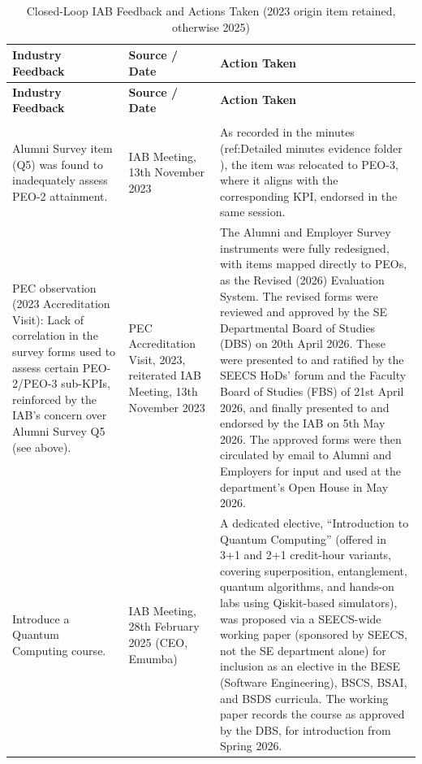 \begingroup
\footnotesize
\setlength{\tabcolsep}{4pt}
\renewcommand{\arraystretch}{1.2}
\begin{longtable}[]{@{}>{\raggedright\arraybackslash}p{}>{\raggedright\arraybackslash}p{}>{\raggedright\arraybackslash}p{}@{}}
\caption{Closed-Loop IAB Feedback and Actions Taken (2023 origin item retained, otherwise 2025)}\label{tab:iab_closed_loop}\\
\toprule
\textbf{Industry Feedback} & \textbf{Source / Date} & \textbf{Action Taken}\\
\midrule
\endfirsthead
\toprule
\textbf{Industry Feedback} & \textbf{Source / Date} & \textbf{Action Taken}\\
\midrule
\endhead
\midrule
\multicolumn{3}{r}{\footnotesize\itshape Continued on next page}\\
\endfoot
\bottomrule
\endlastfoot
Alumni Survey item (Q5) was found to inadequately assess PEO-2 attainment. & IAB Meeting, 13th November 2023 & As recorded in the minutes (ref:Detailed minutes evidence folder ), the item was relocated to PEO-3, where it aligns with the corresponding KPI, endorsed in the same session.\\
\addlinespace
PEC observation (2023 Accreditation Visit): Lack of correlation in the survey forms used to assess certain PEO-2/PEO-3 sub-KPIs, reinforced by the IAB's concern over Alumni Survey Q5 (see above). & PEC Accreditation Visit, 2023, reiterated IAB Meeting, 13th November 2023 & The Alumni and Employer Survey instruments were fully redesigned, with items mapped directly to PEOs, as the Revised (2026) Evaluation System. The revised forms were reviewed and approved by the SE Departmental Board of Studies (DBS) on 20th April 2026. These were presented to and ratified by the SEECS HoDs' forum and the Faculty Board of Studies (FBS) of 21st April 2026, and finally presented to and endorsed by the IAB on 5th May 2026. The approved forms were then circulated by email to Alumni and Employers for input and used at the department's Open House in May 2026.\\
\addlinespace
Introduce a Quantum Computing course. & IAB Meeting, 28th February 2025 (CEO, Emumba) & A dedicated elective, ``Introduction to Quantum Computing'' (offered in 3+1 and 2+1 credit-hour variants, covering superposition, entanglement, quantum algorithms, and hands-on labs using Qiskit-based simulators), was proposed via a SEECS-wide working paper (sponsored by SEECS, not the SE department alone) for inclusion as an elective in the BESE (Software Engineering), BSCS, BSAI, and BSDS curricula. The working paper records the course as approved by the DBS, for introduction from Spring 2026.\\

\end{longtable}
